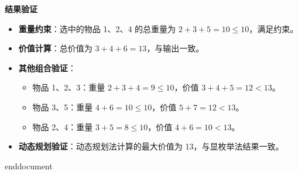 \textbf{结果验证}
\begin{itemize}
    \item \textbf{重量约束}：选中的物品 1、2、4 的总重量为 \( 2 + 3 + 5 = 10 \leq 10 \)，满足约束。
    \item \textbf{价值计算}：总价值为 \( 3 + 4 + 6 = 13 \)，与输出一致。
    \item \textbf{其他组合验证}：
        \begin{itemize}
            \item 物品 1、2、3：重量 \( 2 + 3 + 4 = 9 \leq 10 \)，价值 \( 3 + 4 + 5 = 12 < 13 \)。
            \item 物品 3、5：重量 \( 4 + 6 = 10 \leq 10 \)，价值 \( 5 + 7 = 12 < 13 \)。
            \item 物品 2、4：重量 \( 3 + 5 = 8 \leq 10 \)，价值 \( 4 + 6 = 10 < 13 \)。
        \end{itemize}
    \item \textbf{动态规划验证}：动态规划法计算的最大价值为 13，与显枚举法结果一致。
\end{itemize}

\ifx\allfiles\undefined
    
    
    
    end{document}
    \else
    \fi